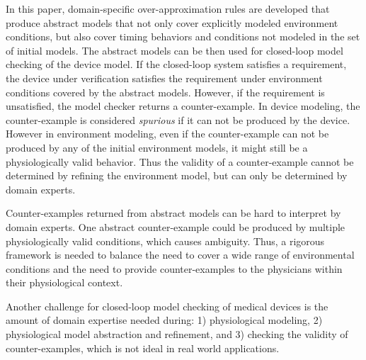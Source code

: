 In this paper, domain-specific over-approximation rules are developed that produce abstract models that not only cover explicitly modeled environment conditions, but also cover timing behaviors and conditions not modeled in the set of initial models. 
The abstract models can be then used for closed-loop model checking of the device model. 
If the closed-loop system satisfies a requirement, the device under verification satisfies the requirement under environment conditions covered by the abstract models. 
However, if the requirement is unsatisfied, the model checker returns a counter-example. 
In device modeling, the counter-example is considered \emph{spurious} if it can not be produced by the device.
However in environment modeling, even if the counter-example can not be produced by any of the initial environment models, it might still be a physiologically valid behavior.
Thus the validity of a counter-example cannot be determined by refining the environment model, but can only be determined by domain experts. 

Counter-examples returned from abstract models can be hard to interpret by domain experts.
One abstract counter-example could be produced by multiple physiologically valid conditions, which causes ambiguity.
Thus, a rigorous framework is needed to balance the need to cover a wide range of environmental conditions and the need to provide counter-examples to the physicians within their physiological context.

Another challenge for closed-loop model checking of medical devices is the amount of domain expertise needed during: 1) physiological modeling, 2) physiological model abstraction and refinement, and 3) checking the validity of counter-examples, which is not ideal in real world applications. 


